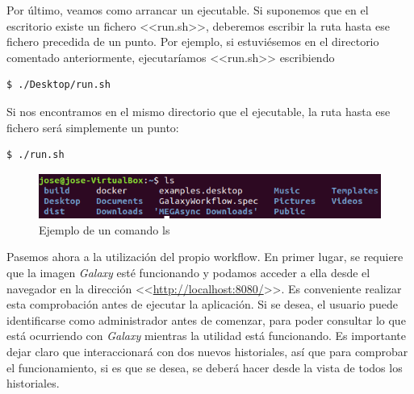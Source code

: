 Por último, veamos como arrancar un ejecutable. Si suponemos que en el escritorio existe un fichero <<run.sh>>, deberemos escribir la ruta hasta ese fichero precedida de un punto. Por ejemplo, si estuviésemos en el directorio comentado anteriormente, ejecutaríamos <<run.sh>> escribiendo
\begin{lstlisting}[language=bash]
    $ ./Desktop/run.sh
\end{lstlisting}
 Si nos encontramos en el mismo directorio que el ejecutable, la ruta hasta ese fichero será simplemente un punto: 
 \begin{lstlisting}[language=bash]
    $ ./run.sh
\end{lstlisting}

\begin{figure}[!h]
    \begin{center}
      \includegraphics[scale=0.8]{images/ls.png}
      \caption{Ejemplo de un comando ls}
      \label{fig:ls}
    \end{center}
\end{figure}

Pasemos ahora a la utilización del propio workflow. En primer lugar, se requiere que la imagen \textit{Galaxy} esté funcionando y podamos acceder a ella desde el navegador en la dirección <<\url{http://localhost:8080/}>>. Es conveniente realizar esta comprobación antes de ejecutar la aplicación. Si se desea, el usuario puede identificarse como administrador antes de comenzar, para poder consultar lo que está ocurriendo con \textit{Galaxy} mientras la utilidad está funcionando. Es importante dejar claro que interaccionará con dos nuevos historiales, así que para comprobar el funcionamiento, si es que se desea, se deberá hacer desde la vista de todos los historiales.

